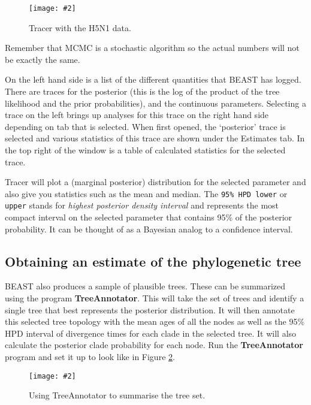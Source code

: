 \documentclass{article}
\newcommand{\includeimage}[2][]{%
\texttt{[image: \#2]}
}
\begin{document}
\begin{figure}
\centering	
\includeimage[scale=0.3]{figures/Tracer}
\caption{Tracer with the H5N1 data.}
\label{fig.tracer} 
\end{figure}


Remember that MCMC is a stochastic algorithm so the actual numbers will not be exactly the same.

On the left hand side is a list of the different quantities that BEAST has logged. There are traces for the posterior (this
is the log of the product of the tree likelihood and the prior probabilities), and the continuous parameters. Selecting a trace
on the left brings up analyses for this trace on the right hand side depending on tab that is selected. When first opened, the
`posterior' trace is selected and various statistics of this trace are shown under the Estimates tab.
In the top right of the window is a table of calculated statistics for the selected trace. 

Tracer will plot a (marginal posterior) distribution for the selected parameter and also give you statistics such as the mean and median. The \texttt{95\% HPD lower} or \texttt {upper} stands for {\it highest posterior density interval} and represents the most compact interval on the selected parameter that contains 95\% of the posterior probability. It can be thought of as a Bayesian analog to a confidence interval. 

\subsection*{Obtaining an estimate of the phylogenetic tree}

BEAST also produces a sample of plausible trees. 
These can be summarized using the program {\bf TreeAnnotator}. This will take the set of trees and identify a single tree that best represents the posterior distribution. It will then annotate this selected tree topology with the mean ages of all the
nodes as well as the 95\% HPD interval of divergence times for each clade in the selected tree. It will also calculate the posterior clade probability for each
node. Run the {\bf TreeAnnotator} program and set it up to look like in Figure \ref{fig.TreeAnnotator}.

\begin{figure}
\centering	
\includeimage[scale=0.4]{figures/TreeAnnotator}
\caption{Using TreeAnnotator to summarise the tree set.}
\label{fig.TreeAnnotator} 
\end{figure}
\end{document}

